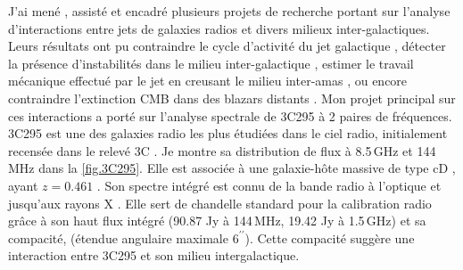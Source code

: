 \pg
J'ai men\'e \cite{2022A&A...658A..10B}, assist\'e \cite{2022A&A...661A..92B} et encadr\'e \cite{2021A&A...650A.170B,2022A&A...663A..44K} plusieurs projets de recherche portant sur l'analyse d'interactions entre jets de galaxies radios et divers milieux inter-galactiques. Leurs r\'esultats ont pu contraindre le cycle d'activit\'e du jet galactique \cite{2022A&A...661A..92B}, d\'etecter la pr\'esence d'instabilit\'es dans le milieu inter-galactique \cite{2022A&A...661A..92B}, estimer le travail m\'ecanique effectu\'e par le jet en creusant le milieu inter-amas \cite{2021A&A...650A.170B}, ou encore contraindre l'extinction CMB dans des blazars distants \cite{2022A&A...663A..44K}. Mon projet principal sur ces interactions \cite{2022A&A...658A..10B} a port\'e sur l'analyse spectrale de 3C295 \`a 2 paires de fr\'equences. 
3C295 est une des galaxies radio les plus \'etudi\'ees dans le ciel radio, initialement recens\'ee dans le relev\'e 3C \cite{1959MmRAS..68...37E}. Je montre sa distribution de flux \`a 8.5\,GHz et 144\,MHz dans la \cref{fig.3C295}. Elle est associ\'ee \`a une galaxie-h\^ote massive de type cD \cite{1981ApJ...251..485M}, ayant $z=0.461$ \cite{2013yCat.5139....0A}. Son spectre int\'egr\'e est connu de la bande radio \cite{1990MNRAS.244..362A,1991AJ....101.1623P, 1983IEEEP..71.1295N,2011ApJ...739L...1P} \`a l'optique \cite[e.g.][]{1994A&A...285..785T} et jusqu'aux rayons X \cite[e.g.][]{2000ApJ...530L..81H,2001A&A...372..755B}. Elle sert de chandelle standard pour la calibration radio \cite{2012MNRAS.423L..30S,2017ApJS..230....7P} gr\^ace \`a son haut flux int\'egr\'e (90.87 Jy \`a 144\,MHz, 19.42 Jy \`a 1.5\,GHz) et sa compacit\'e, (\'etendue angulaire maximale $6^{\prime\prime}$). Cette compacit\'e sugg\`ere une interaction entre 3C295 et son milieu intergalactique.%




